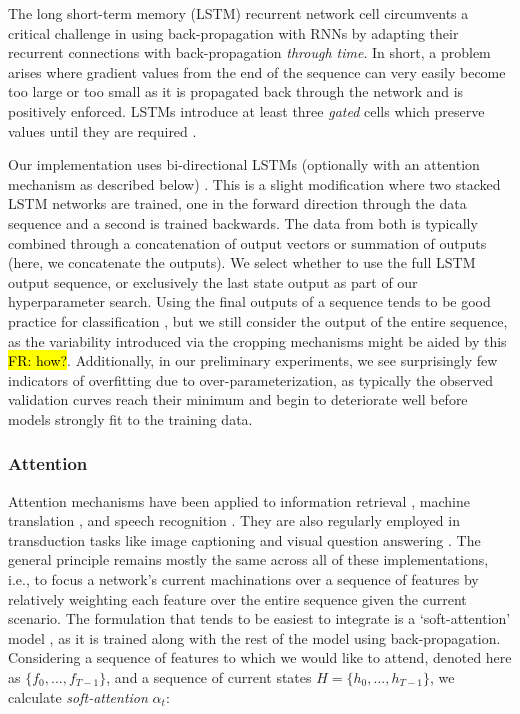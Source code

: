 \documentclass[utf8]{frontiersSCNS} %
\newcommand{\FR}[1]{{\small \textcolor{red}{\hl{FR: #1}}}}
\begin{document}
The long short-term memory (LSTM) \cite{Hochreiter1997a} recurrent network cell circumvents a critical challenge in using back-propagation with RNNs by adapting their recurrent connections with back-propagation {\em through time}. In short, a problem arises where gradient values from the end of the sequence can very easily become too large or too small as it is propagated back through the network and is positively enforced. LSTMs introduce at least three \emph{gated} cells which preserve values until they are required  \cite{GravesRNNBook}.

Our implementation uses bi-directional LSTMs (optionally with an attention mechanism as described below) \cite{GravesRNNBook}. This is a slight modification where two stacked LSTM networks are trained, one in the forward direction through the data sequence and a second is trained backwards. The data from both is typically combined through a concatenation of output vectors or summation of outputs (here, we concatenate the outputs). We select whether to use the full LSTM output sequence, or exclusively the last state output as part of our hyperparameter search. Using the final outputs of a sequence tends to be good practice for classification \cite{}, but we still consider the output of the entire sequence, as the variability introduced via the cropping mechanisms might be aided by this \FR{how?}. Additionally, in our preliminary experiments, we see surprisingly few indicators of overfitting due to over-parameterization, as typically the observed validation curves reach their minimum and begin to deteriorate well before models strongly fit to the training data. 

\subsubsection{Attention}


Attention mechanisms have been applied to information retrieval \cite{Moritz}, machine translation \cite{machine_translation}, and speech recognition \cite{Bahdanau}. They are also regularly employed in transduction tasks like image captioning \cite{XuKELVINXU, etc.} and visual question answering \cite{}. The general principle remains mostly the same across all of these implementations, i.e., to focus a network's current machinations over a sequence of features by relatively weighting each feature over the entire sequence given the current scenario. The formulation that tends to be easiest to integrate is a `soft-attention' model \cite{XuKELVINXU}, as it is trained along with the rest of the model using back-propagation. Considering a sequence of features to which we would like to attend, denoted here as $\{f_0, ..., f_{T-1}\}$, and a sequence of current states $H = \{h_0,...,h_{T-1}\}$, we calculate \emph{soft-attention} $\alpha_t$: 
\end{document}
